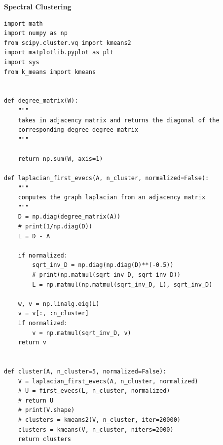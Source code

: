 \documentclass[12pt]{article} \usepackage[utf8]{inputenc}
\begin{document}
\textbf{Spectral Clustering}
\begin{lstlisting}
import math
import numpy as np
from scipy.cluster.vq import kmeans2
import matplotlib.pyplot as plt
import sys
from k_means import kmeans


def degree_matrix(W):
    """
    takes in adjacency matrix and returns the diagonal of the
    corresponding degree degree matrix
    """

    return np.sum(W, axis=1)

def laplacian_first_evecs(A, n_cluster, normalized=False):
    """
    computes the graph laplacian from an adjacency matrix
    """
    D = np.diag(degree_matrix(A))
    # print(1/np.diag(D))
    L = D - A

    if normalized:
        sqrt_inv_D = np.diag(np.diag(D)**(-0.5))
        # print(np.matmul(sqrt_inv_D, sqrt_inv_D))
        L = np.matmul(np.matmul(sqrt_inv_D, L), sqrt_inv_D)

    w, v = np.linalg.eig(L)
    v = v[:, :n_cluster]
    if normalized:
        v = np.matmul(sqrt_inv_D, v)
    return v


def cluster(A, n_cluster=5, normalized=False):
    V = laplacian_first_evecs(A, n_cluster, normalized)
    # U = first_evecs(L, n_cluster, normalized)
    # return U
    # print(V.shape)
    # clusters = kmeans2(V, n_cluster, iter=20000)
    clusters = kmeans(V, n_cluster, niters=2000)
    return clusters
\end{lstlisting}
\end{document}
